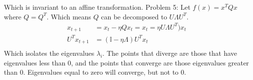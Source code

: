 \documentclass{article}
\begin{document}
Which is invariant to an affine transformation. 
\noindent
{\large Problem 5:}
\newline
Let $f(x) = x^T Q x$ where $Q = Q^T$. Which means $Q$ can be decomposed to $U\Lambda U^T$. 
\begin{align*}
	x_{t+1} &= x_t - \eta Q x_t = x_t = \eta U \Lambda U^T) x_t \\
	U^T x_{t+1} &= (\mathbb{I} - \eta \Lambda)U^T x_t \\
\end{align*}
Which isolates the eigenvalues $\lambda_i$. The points that diverge are those that have eigenvalues less than 0, and the points that converge are those eigenvalues greater than 0. Eigenvalues equal to zero will converge, but not to 0. 
\end{document}
